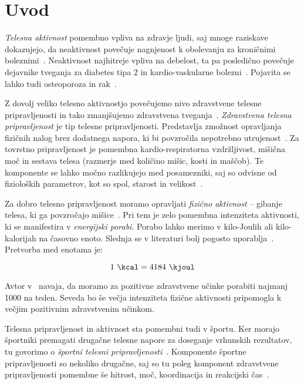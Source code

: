 \chapter{Uvod} \label{uvod}
\emph{Telesna aktivnost} pomembno vpliva na zdravje ljudi, saj mnoge raziskave dokazujejo, da neaktivnost povečuje nagnjenost k obolevanju za kroničnimi boleznimi~\cite{warburton2006health}. Neaktivnost najhitreje vpliva na debelost, ta pa posledično povečuje dejavnike tveganja za diabetes tipa 2 in kardio-vaskularne bolezni~\cite{bassuk2005epidemiological}. Pojavita se lahko tudi osteoporoza in rak~\cite{warburton2006health}. 

Z dovolj veliko telesno aktivnostjo povečujemo nivo zdravstvene telesne pripravljenosti in tako zmanjšujemo zdravstvena tveganja~\cite{caspersen1985physical}. \emph{Zdravstvena telesna pripravljenost} je tip telesne pripravljenosti. Predstavlja zmožnost opravljanja fizičnih nalog brez dodatnega napora, ki bi povzročila nepotrebno utrujenost~\cite{caspersen1985physical}. Za tovrstno pripravljenost je pomembna kardio-respiratorna vzdržljivost, mišična moč in sestava telesa (razmerje med količino mišic, kosti in maščob). Te komponente se lahko močno razlikujejo med posamezniki, saj so odvisne od fizioloških parametrov, kot so spol, starost in velikost~\cite{caspersen1985physical}.

Za dobro telesno pripravljenost moramo opravljati \emph{fizično aktivnost} -- gibanje telesa, ki ga povzročajo mišice~\cite{caspersen1985physical}. Pri tem je zelo pomembna intenziteta aktivnosti, ki se manifestira v \emph{energijski porabi}. Porabo lahko merimo v kilo-Joulih ali kilo-kalorijah na časovno enoto. Slednja se v literaturi bolj pogosto uporablja~\cite{caspersen1985physical}. Pretvorba med enotama je: 

\begin{equation} \label{eq:pretvorba}
	1~\mathrm{\si{\kcal}} = 4184~\mathrm{\si{\kjoul}}
\end{equation}


Avtor v~\cite{warburton2006health} navaja, da moramo za pozitivne zdravstvene učinke porabiti najmanj \SI{1000}{\kcal} na teden. Seveda bo še večja intenziteta fizične aktivnosti pripomogla k večjim pozitivnim zdravstvenim učinkom.

Telesna pripravljenost in aktivnost sta pomembni tudi v športu. Ker morajo športniki premagati drugačne telesne napore za doseganje vrhunskih rezultatov, tu govorimo o \emph{športni telesni pripravljenosti}~\cite{caspersen1985physical}. Komponente športne pripravljenosti so nekoliko drugačne, saj so tu poleg komponent zdravstvene pripravljenosti pomembne še hitrost, moč, koordinacija in reakcijski čas~\cite{caspersen1985physical}.

